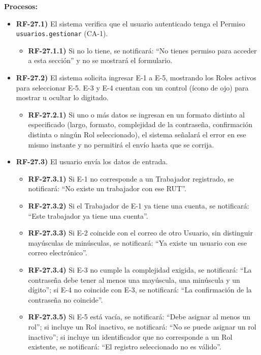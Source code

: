 \textbf{Procesos:}
\begin{itemize}[label={}, leftmargin=1.5em]
  \item \textbf{RF-27.1)} El sistema verifica que el usuario autenticado tenga el Permiso \texttt{usuarios.gestionar} (CA-1).
  \begin{itemize}[label={}, leftmargin=1.5em]
    \item \textbf{RF-27.1.1)} Si no lo tiene, se notificar\'a: ``No tienes permiso para acceder a esta secci\'on'' y no se mostrar\'a el formulario.
  \end{itemize}
  \item \textbf{RF-27.2)} El sistema solicita ingresar E-1 a E-5, mostrando los Roles activos para seleccionar E-5. E-3 y E-4 cuentan con un control (\'icono de ojo) para mostrar u ocultar lo digitado.
  \begin{itemize}[label={}, leftmargin=1.5em]
    \item \textbf{RF-27.2.1)} Si uno o m\'as datos se ingresan en un formato distinto al especificado (largo, formato, complejidad de la contrase\~na, confirmaci\'on distinta o ning\'un Rol seleccionado), el sistema se\~nalar\'a el error en ese mismo instante y no permitir\'a el env\'io hasta que se corrija.
  \end{itemize}
  \item \textbf{RF-27.3)} El usuario env\'ia los datos de entrada.
  \begin{itemize}[label={}, leftmargin=1.5em]
    \item \textbf{RF-27.3.1)} Si E-1 no corresponde a un Trabajador registrado, se notificar\'a: ``No existe un trabajador con ese RUT''.
    \item \textbf{RF-27.3.2)} Si el Trabajador de E-1 ya tiene una cuenta, se notificar\'a: ``Este trabajador ya tiene una cuenta''.
    \item \textbf{RF-27.3.3)} Si E-2 coincide con el correo de otro Usuario, sin distinguir may\'usculas de min\'usculas, se notificar\'a: ``Ya existe un usuario con ese correo electr\'onico''.
    \item \textbf{RF-27.3.4)} Si E-3 no cumple la complejidad exigida, se notificar\'a: ``La contrase\~na debe tener al menos una may\'uscula, una min\'uscula y un d\'igito''; si E-4 no coincide con E-3, se notificar\'a: ``La confirmaci\'on de la contrase\~na no coincide''.
    \item \textbf{RF-27.3.5)} Si E-5 est\'a vac\'ia, se notificar\'a: ``Debe asignar al menos un rol''; si incluye un Rol inactivo, se notificar\'a: ``No se puede asignar un rol inactivo''; si incluye un identificador que no corresponde a un Rol existente, se notificar\'a: ``El registro seleccionado no es v\'alido''.

\end{itemize}
\end{itemize}
